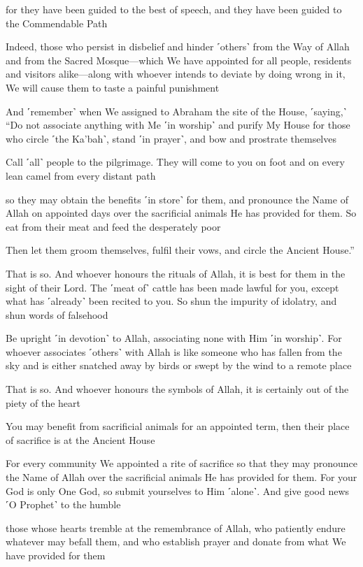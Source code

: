 for they have been guided to the best of speech, and they have been guided to the Commendable Path

Indeed, those who persist in disbelief and hinder ˹others˺ from the Way of Allah and from the Sacred Mosque—which We have appointed for all people, residents and visitors alike—along with whoever intends to deviate by doing wrong in it, We will cause them to taste a painful punishment

And ˹remember˺ when We assigned to Abraham the site of the House, ˹saying,˺ “Do not associate anything with Me ˹in worship˺ and purify My House for those who circle ˹the Ka’bah˺, stand ˹in prayer˺, and bow and prostrate themselves

Call ˹all˺ people to the pilgrimage. They will come to you on foot and on every lean camel from every distant path

so they may obtain the benefits ˹in store˺ for them, and pronounce the Name of Allah on appointed days over the sacrificial animals He has provided for them. So eat from their meat and feed the desperately poor

Then let them groom themselves, fulfil their vows, and circle the Ancient House.”

That is so. And whoever honours the rituals of Allah, it is best for them in the sight of their Lord. The ˹meat of˺ cattle has been made lawful for you, except what has ˹already˺ been recited to you. So shun the impurity of idolatry, and shun words of falsehood

Be upright ˹in devotion˺ to Allah, associating none with Him ˹in worship˺. For whoever associates ˹others˺ with Allah is like someone who has fallen from the sky and is either snatched away by birds or swept by the wind to a remote place

That is so. And whoever honours the symbols of Allah, it is certainly out of the piety of the heart

You may benefit from sacrificial animals for an appointed term, then their place of sacrifice is at the Ancient House

For every community We appointed a rite of sacrifice so that they may pronounce the Name of Allah over the sacrificial animals He has provided for them. For your God is only One God, so submit yourselves to Him ˹alone˺. And give good news ˹O Prophet˺ to the humble

those whose hearts tremble at the remembrance of Allah, who patiently endure whatever may befall them, and who establish prayer and donate from what We have provided for them

